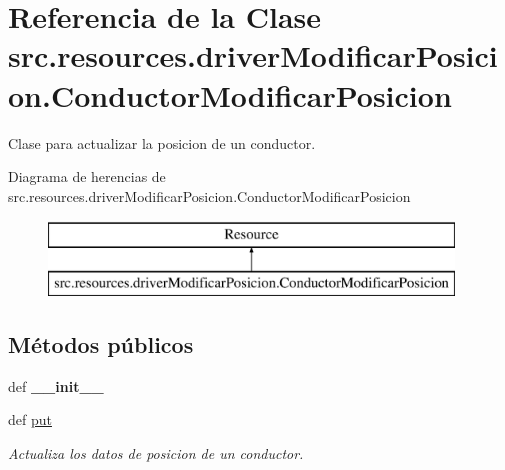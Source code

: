 \hypertarget{classsrc_1_1resources_1_1driver_modificar_posicion_1_1_conductor_modificar_posicion}{\section{Referencia de la Clase src.\-resources.\-driver\-Modificar\-Posicion.\-Conductor\-Modificar\-Posicion}
\label{classsrc_1_1resources_1_1driver_modificar_posicion_1_1_conductor_modificar_posicion}
}


Clase para actualizar la posicion de un conductor.  


Diagrama de herencias de src.\-resources.\-driver\-Modificar\-Posicion.\-Conductor\-Modificar\-Posicion\begin{figure}[H]
\begin{center}
\leavevmode
\includegraphics[height=2.000000cm]{classsrc_1_1resources_1_1driver_modificar_posicion_1_1_conductor_modificar_posicion}
\end{center}
\end{figure}
\subsection*{Métodos públicos}
\begin{DoxyCompactItemize}
\item 
\hypertarget{classsrc_1_1resources_1_1driver_modificar_posicion_1_1_conductor_modificar_posicion_a54c8ffdffc9d1a7057ec8fea60b6c92f}{def {\bfseries \-\_\-\-\_\-init\-\_\-\-\_\-}}\label{classsrc_1_1resources_1_1driver_modificar_posicion_1_1_conductor_modificar_posicion_a54c8ffdffc9d1a7057ec8fea60b6c92f}

\item 
def \hyperlink{classsrc_1_1resources_1_1driver_modificar_posicion_1_1_conductor_modificar_posicion_a93cfdaaee4b2f167fff1a96f5b2924d7}{put}
\begin{DoxyCompactList}\small\item\em Actualiza los datos de posicion de un conductor. \end{DoxyCompactList}\end{DoxyCompactItemize}
